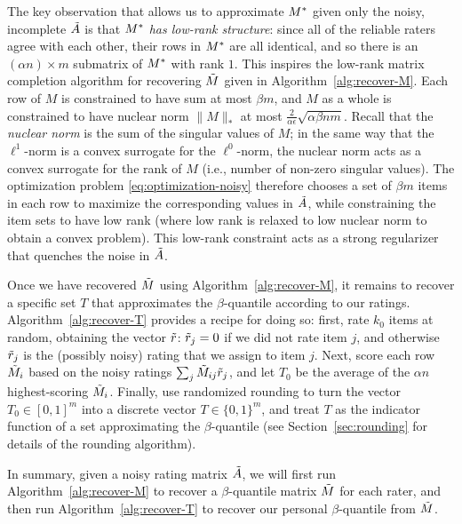 The key observation that allows us to approximate $M^*$ given only the noisy, 
incomplete $\tilde{A}$ is that \emph{$M^*$ has low-rank structure}: since all 
of the reliable raters agree with each other, their rows in $M^*$ are all 
identical, and so there is an $(\alpha n) \times m$ submatrix of $M^*$ with 
rank $1$. This inspires the low-rank matrix completion algorithm for recovering 
$\tilde{M}$ given in Algorithm~\ref{alg:recover-M}. Each row of $M$ is constrained 
to have sum at most $\beta m$, and $M$ as a whole is constrained to have 
nuclear norm $\|M\|_*$ at most $\frac{2}{\alpha \epsilon}\sqrt{\alpha\beta nm}$. 
Recall that the \emph{nuclear norm} is the sum of the singular values of 
$M$; in the same way that the $\ell^1$-norm is a convex surrogate for the 
$\ell^0$-norm, the nuclear norm acts as a convex surrogate for the rank of $M$ 
(i.e., number of non-zero singular values). The optimization problem 
\eqref{eq:optimization-noisy} therefore chooses a set of $\beta m$ items in each 
row to maximize the corresponding values in $\tilde{A}$, while constraining the item 
sets to have low rank (where low rank is relaxed to low nuclear norm to obtain 
a convex problem). 
This low-rank constraint acts as a strong regularizer that quenches the noise 
in $\tilde{A}$.



Once we have recovered $\tilde{M}$ using Algorithm~\ref{alg:recover-M}, it remains to 
recover a specific set $T$ that approximates the $\beta$-quantile according to 
our ratings. Algorithm~\ref{alg:recover-T} provides a recipe for doing so: 
first, rate $k_0$ items at random, obtaining the vector $\tilde{r}$:
$\tilde{r}_j = 0$ if we did not rate item $j$, and otherwise $\tilde{r}_j$ is 
the (possibly noisy) rating that we assign to item $j$. Next, score each 
row $\tilde{M}_{i}$ based on the noisy ratings $\sum_j \tilde{M}_{ij}\tilde{r}_j$, and let 
$T_0$ be the average of the $\alpha n$ highest-scoring $\tilde{M}_i$.
Finally, use randomized rounding to turn the vector $T_0 \in [0,1]^m$ into 
a discrete vector $T \in \{0,1\}^m$, and treat $T$ as the indicator function 
of a set approximating the $\beta$-quantile
(see Section~\ref{sec:rounding} for details of the rounding algorithm).

In summary, given a noisy rating matrix $\tilde{A}$, we will first run 
Algorithm~\ref{alg:recover-M} to recover a $\beta$-quantile matrix $\tilde{M}$ for 
each rater, and then run Algorithm~\ref{alg:recover-T} to recover our 
personal $\beta$-quantile from $\tilde{M}$.

